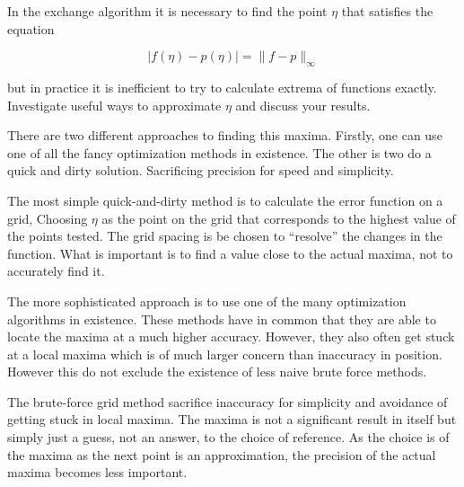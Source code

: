 \begin{problem}
  In the exchange algorithm it is necessary to find the point $\eta$
  that satisfies the equation

  \begin{equation}
    |f (\eta) − p (\eta)| = \|f − p\|_{\infty}
  \end{equation}

  but in practice it is inefficient to try to calculate extrema of
  functions exactly.  Investigate useful ways to approximate $\eta$ and
  discuss your results.
\end{problem}


\begin{solution}
  There are two different approaches to finding this maxima. Firstly,
  one can use one of all the fancy optimization methods in
  existence. The other is two do a quick and dirty
  solution. Sacrificing precision for speed and simplicity.

  The most simple quick-and-dirty method is to calculate the error
  function on a grid, Choosing $\eta$ as the point on the grid that
  corresponds to the highest value of the points tested. The grid
  spacing is be chosen to ``resolve'' the changes in the
  function. What is important is to find a value close to the actual
  maxima, not to accurately find it.

  The more sophisticated approach is to use one of the many
  optimization algorithms in existence. These methods have in common
  that they are able to locate the maxima at a much higher
  accuracy. However, they also often get stuck at a local maxima which
  is of much larger concern than inaccuracy in position. However this
  do not exclude the existence of less naive brute force methods.

  The brute-force grid method sacrifice inaccuracy for simplicity and
  avoidance of getting stuck in local maxima. The maxima is not a
  significant result in itself but simply just a guess, not an answer,
  to the choice of reference. As the choice is of the maxima as the
  next point is an approximation, the precision of the actual maxima
  becomes less important. 
\end{solution}

